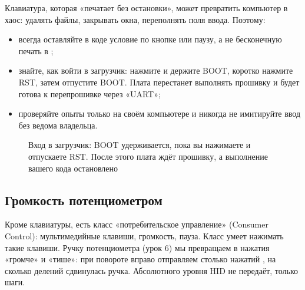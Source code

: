 \begin{caution}
Клавиатура, которая «печатает без остановки», может превратить компьютер в хаос: удалять файлы, закрывать
окна, переполнять поля ввода. Поэтому:
\begin{itemize}[leftmargin=*]
  \item всегда оставляйте в коде условие по кнопке или паузу, а не бесконечную печать в ;
  \item знайте, как войти в загрузчик: нажмите и держите BOOT, коротко нажмите RST, затем отпустите BOOT. Плата
        перестанет выполнять прошивку и будет готова к перепрошивке через «UART»;
  \item проверяйте опыты только на своём компьютере и никогда не имитируйте ввод без ведома владельца.
\end{itemize}
\end{caution}

\begin{figure}[H]
\centering
{}
\caption{Вход в загрузчик: BOOT удерживается, пока вы нажимаете и отпускаете RST. После этого
плата ждёт прошивку, а выполнение вашего кода остановлено}
\end{figure}

\subsection{Громкость потенциометром}

Кроме клавиатуры, есть класс «потребительское управление» (Consumer Control): мультимедийные клавиши,
громкость, пауза. Класс  умеет нажимать такие клавиши. Ручку потенциометра
(урок 6) мы превращаем в нажатия «громче» и «тише»: при повороте вправо отправляем столько нажатий
, на сколько делений сдвинулась ручка. Абсолютного уровня HID не передаёт,
только шаги.

